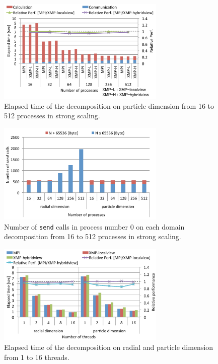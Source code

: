 \begin{figure}[ht]
\begin{center}
\includegraphics[width=8cm, bb=0 0 492 306]{./figure/particle_s.pdf}

\caption{Elapsed time of the decomposition on particle dimension from 16 to 512 processes in strong scaling.}
\label{particle_s}
\end{center}
\end{figure}


\begin{figure}[t]
\begin{center}
\includegraphics[width=8cm, bb=0 0 492 294]{./figure/comm_s.pdf}
\caption{Number of {\tt send} calls in process number 0 on each domain decomposition from 16 to 512 processes in strong scaling.}
\label{comm_s}
\end{center}
\end{figure}







\begin{figure}[t]
\begin{center}
\includegraphics[width=8cm, bb=0 0 492 294]{./figure/omp.pdf}
\caption{Elapsed time of the decomposition on radial and particle dimension from 1 to 16 threads.}
\label{mop}
\end{center}
\end{figure}


